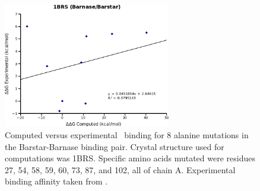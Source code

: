 \begin{figure}[h]
    \centering
    \includegraphics[width=0.65\textwidth]{figures/1brs_barnase_barstar.png}
    \caption{Computed versus experimental \ddg\ binding for 8 alanine mutations in the Barstar-Barnase binding pair.
    Crystal structure used for computations was 1BRS.
    Specific amino acids mutated were residues 27, 54, 58, 59, 60, 73, 87, and 102, all of chain A.
    Experimental binding affinity taken from \protect\cite{thorn2001asedb}.}
    \label{figure:computational_mutation_scanning/1BRSa_ddg}
\end{figure}





